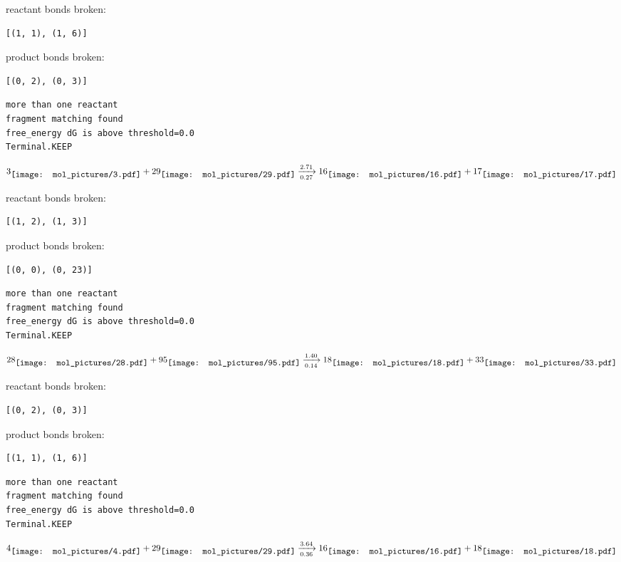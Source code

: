 \documentclass{article}
\begin{document}
reactant bonds broken:\begin{verbatim}
[(1, 1), (1, 6)]
\end{verbatim}
product bonds broken:\begin{verbatim}
[(0, 2), (0, 3)]
\end{verbatim}




\vspace{1cm}
\begin{verbatim}
more than one reactant
fragment matching found
free_energy dG is above threshold=0.0
Terminal.KEEP
\end{verbatim}
$$
3
\raisebox{-.5\height}{\texttt{[image: mol\_pictures/3.pdf]}}
+
29
\raisebox{-.5\height}{\texttt{[image: mol\_pictures/29.pdf]}}
\xrightarrow[0.27]{2.71}
16
\raisebox{-.5\height}{\texttt{[image: mol\_pictures/16.pdf]}}
+
17
\raisebox{-.5\height}{\texttt{[image: mol\_pictures/17.pdf]}}
$$


reactant bonds broken:\begin{verbatim}
[(1, 2), (1, 3)]
\end{verbatim}
product bonds broken:\begin{verbatim}
[(0, 0), (0, 23)]
\end{verbatim}




\vspace{1cm}
\begin{verbatim}
more than one reactant
fragment matching found
free_energy dG is above threshold=0.0
Terminal.KEEP
\end{verbatim}
$$
28
\raisebox{-.5\height}{\texttt{[image: mol\_pictures/28.pdf]}}
+
95
\raisebox{-.5\height}{\texttt{[image: mol\_pictures/95.pdf]}}
\xrightarrow[0.14]{1.40}
18
\raisebox{-.5\height}{\texttt{[image: mol\_pictures/18.pdf]}}
+
33
\raisebox{-.5\height}{\texttt{[image: mol\_pictures/33.pdf]}}
$$


reactant bonds broken:\begin{verbatim}
[(0, 2), (0, 3)]
\end{verbatim}
product bonds broken:\begin{verbatim}
[(1, 1), (1, 6)]
\end{verbatim}




\vspace{1cm}
\begin{verbatim}
more than one reactant
fragment matching found
free_energy dG is above threshold=0.0
Terminal.KEEP
\end{verbatim}
$$
4
\raisebox{-.5\height}{\texttt{[image: mol\_pictures/4.pdf]}}
+
29
\raisebox{-.5\height}{\texttt{[image: mol\_pictures/29.pdf]}}
\xrightarrow[0.36]{3.64}
16
\raisebox{-.5\height}{\texttt{[image: mol\_pictures/16.pdf]}}
+
18
\raisebox{-.5\height}{\texttt{[image: mol\_pictures/18.pdf]}}
$$
\end{document}
